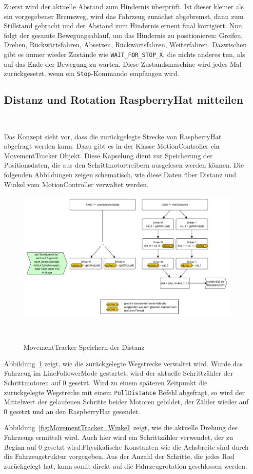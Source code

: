 \documentclass[main.tex]{subfiles} %
\begin{document}
Zuerst wird der aktuelle Abstand zum Hindernis überprüft. Ist dieser kleiner
als ein vorgegebener Bremsweg, wird das Fahrzeug zunächst abgebremst, dann zum
Stillstand gebracht und der Abstand zum Hindernis erneut final korrigiert. Nun
folgt der gesamte Bewegungsablauf, um das Hindernis zu positionieren: Greifen,
Drehen, Rückwärtsfahren, Absetzen, Rückwärtsfahren, Weiterfahren. Dazwischen
gibt es immer wieder Zustände wie \texttt{WAIT\_FOR\_STOP\_X}, die nichts
anderes tun, als auf das Ende der Bewegung zu warten. Diese Zustandsmaschine
wird jedes Mal zurückgesetzt, wenn ein \texttt{Stop}-Kommando empfangen wird.

\subsection{Distanz und Rotation RaspberryHat mitteilen}~\label{apdx:Distanz_Tracking}

Das Konzept sieht vor, dass die zurückgelegte Strecke von RaspberryHat
abgefragt werden kann. Dazu gibt es in der Klasse MotionController ein
MovementTracker Objekt. Diese Kapselung dient zur Speicherung der
Positionsdaten, die aus den Schrittmotortreibern ausgelesen werden können. Die
folgenden Abbildungen zeigen schematisch, wie diese Daten über Distanz und
Winkel vom MotionController verwaltet werden.

\begin{figure}[H]
    \centering
    \includegraphics[width=1\linewidth]{./fig_Firmware_MotionController/PollDistance_cmd.pdf}
    \caption{MovementTracker Speichern der Distanz}~\label{fig:MovementTracker_Distanz}
\end{figure}

Abbildung~\ref{fig:MovementTracker_Distanz} zeigt, wie die zurückgelegte
Wegstrecke verwaltet wird. Wurde das Fahrzeug im LineFollowerMode gestartet,
wird der aktuelle Schrittzähler der Schrittmotoren auf 0 gesetzt. Wird zu einem
späteren Zeitpunkt die zurückgelegte Wegstrecke mit einem \texttt{PollDistance}
Befehl abgefragt, so wird der Mittelwert der gelaufenen Schritte beider Motoren
gebildet, der Zähler wieder auf 0 gesetzt und an den RaspberryHat gesendet.

Abbildung~\ref{fig:MovementTracker_Winkel} zeigt, wie die aktuelle Drehung des
Fahrzeugs ermittelt wird. Auch hier wird ein Schrittzähler verwendet, der zu
Beginn auf 0 gesetzt wird.Physikalische Konstanten wie die Achsbreite sind
durch die Fahrzeugstruktur vorgegeben. Aus der Anzahl der Schritte, die jedes
Rad zurückgelegt hat, kann somit direkt auf die Fahrzeugrotation geschlossen
werden.
\end{document}
